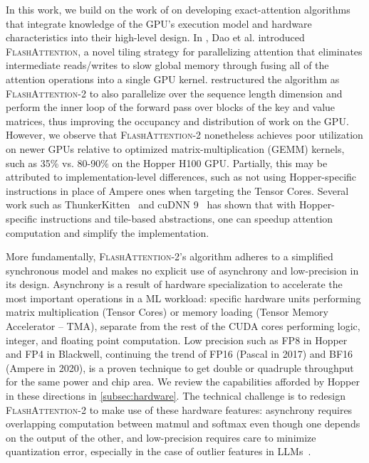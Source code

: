 \documentclass{article}
\newcommand{\fa}{\textsc{FlashAttention}\xspace}
\newcommand{\faa}{\textsc{FlashAttention-2}\xspace}
\begin{document}
In this work, we build on the work of \citet{dao2022flashattention} on developing exact-attention algorithms that integrate knowledge of the GPU's execution model and hardware characteristics into their high-level design.
In \citep{dao2022flashattention}, Dao et al. introduced \fa, a novel tiling strategy for parallelizing attention that eliminates intermediate reads/writes to slow global memory through fusing all of the attention operations into a single GPU kernel.
\citet{dao2023flashattention2} restructured the algorithm as \faa to also parallelize over the sequence length dimension and perform the inner loop of the forward pass over blocks of the key and value matrices, thus improving the occupancy and distribution of work on the GPU.
However, we observe that \faa nonetheless achieves poor utilization on newer GPUs relative to optimized matrix-multiplication (GEMM) kernels, such as 35\% vs. 80-90\% on the Hopper H100 GPU.
Partially, this may be attributed to implementation-level differences, such as not using Hopper-specific instructions in place of Ampere ones when targeting the Tensor Cores.
Several work such as ThunkerKitten~\citep{spector2024thunder} and cuDNN 9~\citep{cudnn9} has shown that
with Hopper-specific instructions and tile-based abstractions, one can speedup
attention computation and simplify the implementation.

More fundamentally, \faa's algorithm adheres to a simplified synchronous model and
makes no explicit use of asynchrony and low-precision in its design.
Asynchrony is a result of hardware specialization to accelerate the most important
operations in a ML workload: specific hardware
units performing matrix multiplication (Tensor Cores) or memory loading
(Tensor Memory Accelerator -- TMA), separate from the rest of the CUDA cores performing logic, integer, and floating
point computation.
Low precision such as FP8 in Hopper and FP4 in Blackwell, continuing the trend
of FP16 (Pascal in 2017) and BF16 (Ampere in 2020), is a proven technique to get
double or quadruple throughput for the same power and chip area.
We review the capabilities afforded by Hopper in these directions in \cref{subsec:hardware}.
The technical challenge is to redesign \faa to make use of these hardware
features: asynchrony requires overlapping computation between matmul and softmax
even though one depends on the output of the other, and low-precision requires
care to minimize quantization error, especially in the case of outlier features
in LLMs~\citep{dettmers2208llm, sun2024massive}.
\end{document}
